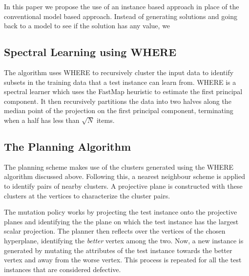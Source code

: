 \documentclass[conference]{IEEEtran}
\begin{document}
In this paper we propose the use of an instance based approach in place of the conventional model based approach. Instead of generating solutions and going back to a model to see if the solution has any value, we 

\subsection{Spectral Learning using WHERE}
The algorithm uses WHERE to recursively cluster the input data to identify subsets in the training data that a test instance can learn from. WHERE is a spectral learner which uses the FastMap heuristic to estimate the first principal component. It then recursively partitions the data into two halves along the median point of the projection on the first principal component, terminating when a half has less than $\sqrt{N}$ items.   

\subsection{The Planning Algorithm}
The planning scheme makes use of the clusters generated using the WHERE algorithm discussed above. Following this, a nearest neighbour scheme is applied to identify pairs of nearby clusters. A projective plane is constructed with these clusters at the vertices to characterize the cluster pairs.

The mutation policy works by projecting the test instance onto the projective planes and identifying the the plane on which the test instance has the largest scalar projection. The planner then reflects over the vertices of the chosen hyperplane, identifying the \textit{better} vertex among the two. Now, a new instance is generated by mutating the attributes of the test instance towards the better vertex and away from the worse vertex. This process is repeated for all the test instances that are considered defective.
\end{document}
